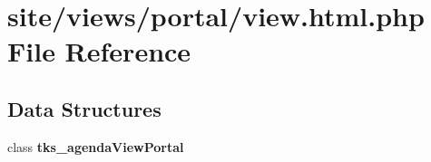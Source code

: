 \section{site/views/portal/view.html.\+php File Reference}
\label{site_2views_2portal_2view_8html_8php}
\subsection*{Data Structures}
\begin{DoxyCompactItemize}
\item 
class \textbf{ tks\+\_\+agenda\+View\+Portal}
\end{DoxyCompactItemize}
